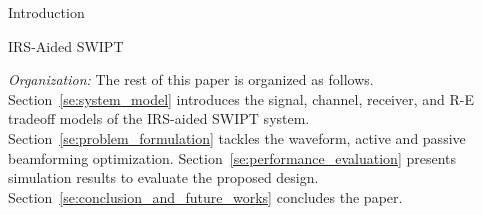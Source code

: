 \documentclass[journal]{IEEEtran}
\begin{document}
\begin{section}{Introduction}
\begin{subsection}{IRS-Aided SWIPT}

			\textit{Organization:} The rest of this paper is organized as follows. Section~\ref{se:system_model} introduces the signal, channel, receiver, and R-E tradeoff models of the IRS-aided SWIPT system. Section~\ref{se:problem_formulation} tackles the waveform, active and passive beamforming optimization. Section~\ref{se:performance_evaluation} presents simulation results to evaluate the proposed design. Section~\ref{se:conclusion_and_future_works} concludes the paper.


\end{subsection}
\end{section}
\end{document}
